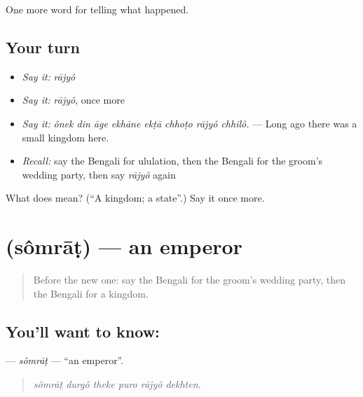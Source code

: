 \begin{grammarlens}[title={What you've built}]
One more word for telling what happened.
\end{grammarlens}

\subsection*{Your turn}
\begin{itemize}
\raggedright
  \item \emph{Say it:} \emph{rājyô}
  \item \emph{Say it:} \emph{rājyô}, once more
  \item \emph{Say it:} \emph{ônek din āge ekhāne ekṭā chhoṭo rājyô chhilô.} — Long ago there was a small kingdom here.
  \item \emph{Recall:} say the Bengali for ululation, then the Bengali for the groom's wedding party, then say \emph{rājyô} again
\end{itemize}

\begin{tcolorbox}[breakable,colback=teal!4,colframe=teal!35!black,title={Before you move on}]
What does  mean? (\textquotedblleft{}A kingdom; a state\textquotedblright{}.) Say it once more.
\end{tcolorbox}
\section[\texorpdfstring{\bn{সম্রাট} (sômrāṭ)}{সম্রাট (sômrāṭ)}]{ (sômrāṭ) — an emperor}

\label{lesson:BN-C313-somrat}



\begin{quote}
Before the new one: say the Bengali for the groom's wedding party, then the Bengali for a kingdom.
\end{quote}

\subsection*{You'll want to know: }
\textbf{} — \emph{sômrāṭ} — \textquotedblleft{}an emperor\textquotedblright{}.

\begin{quote}
     
\end{quote}

\begin{quote}
\emph{sômrāṭ durgô theke puro rājyô dekhten.}
\end{quote}

